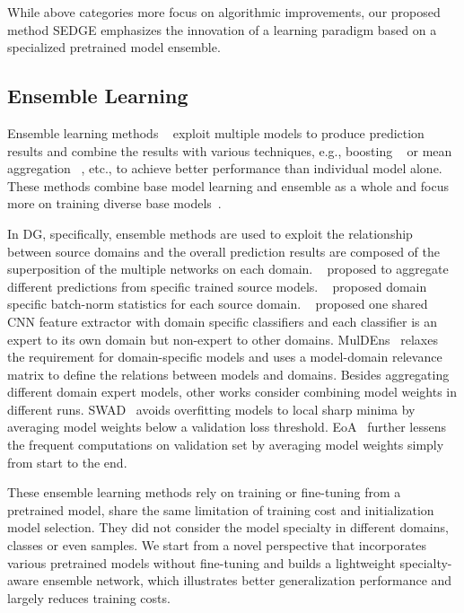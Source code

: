 \documentclass{article}
\begin{document}
While above categories more focus on algorithmic improvements, our proposed method SEDGE emphasizes the innovation of a learning paradigm based on a specialized pretrained model ensemble. 


\subsection{Ensemble Learning}

Ensemble learning methods ~\citep{hansen1990neural,zhou2018diverse} exploit multiple models to produce prediction results and combine the results with various techniques, e.g., boosting ~\citep{schapire1990strength,freund1995boosting,moghimi2016boosted} or mean aggregation ~\citep{zhou2018diverse,zhang2020diversified}, etc., 
to achieve better performance than individual model alone.
These methods combine base model learning and ensemble as a whole and focus more on training diverse base models~\citep{zhou2018diverse}.

In DG, specifically, ensemble methods are used to exploit the relationship between source domains and the overall prediction results are composed of the superposition of the multiple networks on each domain. 
~\citet{mancini2018best} proposed to aggregate different predictions from specific trained source models. ~\citet{segu2020batch} proposed domain specific batch-norm statistics for each source domain. 
~\citet{zhou2021domain} proposed one shared CNN feature extractor with domain specific classifiers and each classifier is an expert to its own domain but non-expert to other domains. 
MulDEns~\citep{thopalli2021multi} relaxes the requirement for domain-specific models and uses a model-domain relevance matrix to define the relations between
models and 
domains.
Besides aggregating different domain expert models, other works consider combining model weights in different runs.
SWAD~\citep{cha2021swad} avoids overfitting models to local sharp minima by averaging model weights below a validation loss threshold. 
EoA~\citep{arpit2021ensemble} further lessens the frequent computations on validation set by averaging model weights simply from start to the end. 

These ensemble learning methods rely on training or fine-tuning from a pretrained model, share the same limitation of training cost and initialization model selection.
They did not consider the model specialty in different domains, classes or even samples.
We start from a novel perspective that incorporates various pretrained models without fine-tuning and builds a lightweight specialty-aware ensemble network, which illustrates better generalization performance and largely reduces training costs.
\end{document}
